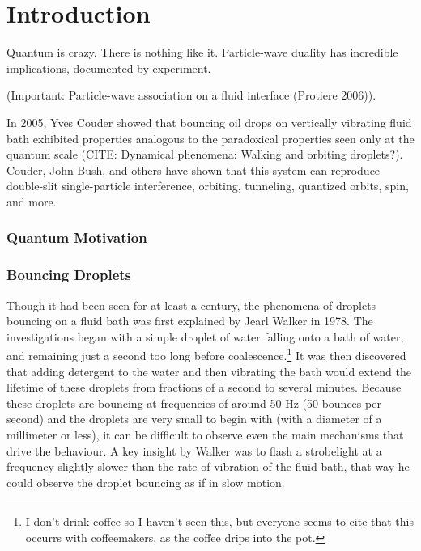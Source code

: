 		
\chapter*{Introduction}

Quantum is crazy. There is nothing like it. Particle-wave duality has incredible implications, documented by experiment.

	(Important: Particle-wave association on a fluid interface (Protiere 2006)).
	    
	    In 2005, Yves Couder showed that bouncing oil drops on vertically vibrating fluid bath exhibited properties analogous to the paradoxical properties seen only at the quantum scale (CITE: Dynamical phenomena:  Walking and orbiting droplets?). Couder, John Bush, and others have shown that this system can reproduce double-slit single-particle interference, orbiting, tunneling, quantized orbits, spin, and more.
	    
	    \subsection{Quantum Motivation}
	    
	    \subsection{Bouncing Droplets}
	    Though it had been seen for at least a century, the phenomena of droplets bouncing on a fluid bath was first explained by Jearl Walker in 1978. The investigations began with a simple droplet of water falling onto a bath of water, and remaining just a second too long before coalescence.\footnote{I don't drink coffee so I haven't seen this, but everyone seems to cite that this occurrs with coffeemakers, as the coffee drips into the pot.} It was then discovered that adding detergent to the water and then vibrating the bath would extend the lifetime of these droplets from fractions of a second to several minutes. Because these droplets are bouncing at frequencies of around 50 Hz (50 bounces per second) and the droplets are very small to begin with (with a diameter of a millimeter or less), it can be difficult to observe even the main mechanisms that drive the behaviour. A key insight by Walker was to flash a strobelight at a frequency slightly slower than the rate of vibration of the fluid bath, that way he could observe the droplet bouncing as if in slow motion.
	    
